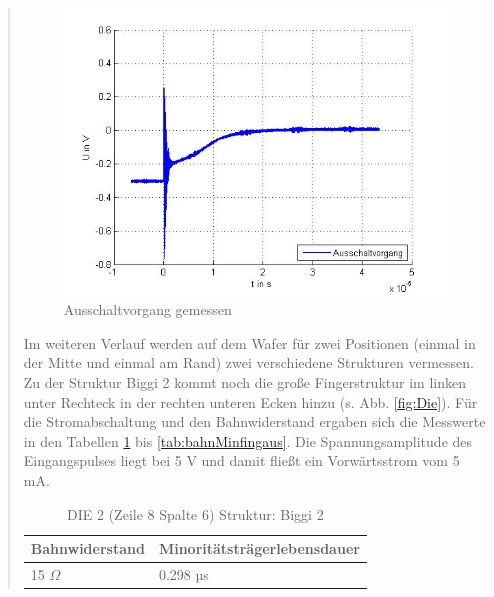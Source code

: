 \begin{quote}
	\begin{figure}[H]
        \centering
        \includegraphics[scale=0.7]{./SchaltverhaltenBilder/Ausschaltvorgang_bild.jpg}
        \caption{Ausschaltvorgang gemessen} 
        \label{fig:aussgemessen}
    \end{figure}
	
	\vspace{2em}
	
	Im weiteren Verlauf werden auf dem Wafer für zwei Positionen (einmal in der
	Mitte und einmal am Rand) zwei verschiedene Strukturen vermessen. Zu der 
	Struktur Biggi 2 kommt noch die große Fingerstruktur im linken unter 
	Rechteck in der rechten unteren Ecken hinzu (s. Abb. \ref{fig:Die}). Für die 
	Stromabschaltung und den Bahnwiderstand ergaben sich die Messwerte in den 
	Tabellen \ref{tab:bahnMinbigmitt} bis \ref{tab:bahnMinfingaus}. Die 
	Spannungsamplitude des Eingangspulses liegt bei 5 V und damit fließt ein
	Vorwärtsstrom vom 5 mA.
	
	\vspace{2em}

      		\begin{table}[H]
     		  \begin{addmargin}[3cm]{3cm}
     			\centering
                   \begin{tabular}{|p{5cm}|p{5cm}|}
         			\hline
         			Bahnwiderstand &  Minoritätsträgerlebensdauer\\
         			\hline
        			15 $\Omega$ & 0.298 µs \\
        			\hline

                    \end{tabular}
              \end{addmargin}
              \caption{DIE 2 (Zeile 8 Spalte 6) Struktur: Biggi 2}
              \label{tab:bahnMinbigmitt}
            \end{table}


\end{quote}

